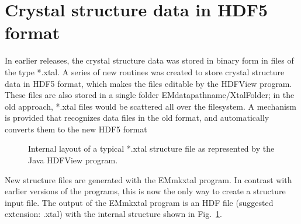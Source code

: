 \documentclass[DIV=calc, paper=letter, fontsize=11pt]{scrartcl}	 %
\begin{document}
\section{Crystal structure data in HDF5 format}
In earlier releases, the crystal structure data was stored in binary form in files of the type \textsf{*.xtal}. 
A series of new routines was created to store crystal structure data in HDF5 format, which makes the 
files editable by the HDFView program.  These files are also stored in a single folder \textsf{EMdatapathname/XtalFolder}; 
in the old approach, \textsf{*.xtal} files would be scattered all over the filesystem. 
A mechanism is provided that recognizes data files in the old format, and automatically converts them to the new HDF5 format

\begin{figure}[h]
\leavevmode\centering
\epsfysize=4in
\caption{\label{fig:XtalFile}Internal layout of a typical \textsf{*.xtal} structure file as represented by the Java \textsf{HDFView} program.}
\end{figure}

New structure files are generated with the \textsf{EMmkxtal} program.  In contrast with earlier versions
of the programs, this is now the only way to create a structure input file.  The output of the \textsf{EMmkxtal}
program is an HDF file (suggested extension: \textsf{.xtal}) with the internal structure shown in Fig.~\ref{fig:XtalFile}.
\end{document}
